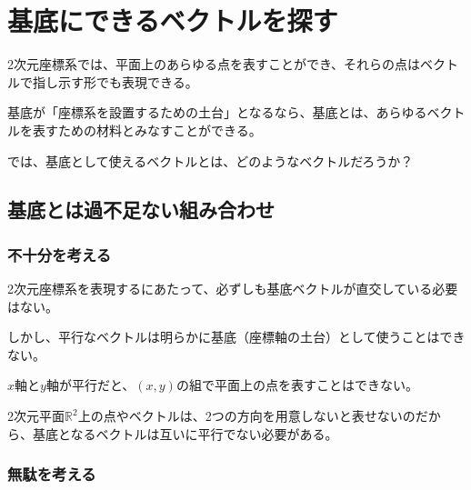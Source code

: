 \documentclass[../../imaging-math]{subfiles}
\begin{document}
\section{基底にできるベクトルを探す}

2次元座標系では、平面上のあらゆる点を表すことができ、それらの点はベクトルで指し示す形でも表現できる。

基底が「座標系を設置するための土台」となるなら、基底とは、あらゆるベクトルを表すための材料とみなすことができる。

\br

では、基底として使えるベクトルとは、どのようなベクトルだろうか？

\subsection{基底とは過不足ない組み合わせ}

\subsubsection{不十分を考える}

2次元座標系を表現するにあたって、必ずしも基底ベクトルが直交している必要はない。

しかし、平行なベクトルは明らかに基底（座標軸の土台）として使うことはできない。

\begin{center}
\end{center}

$x$軸と$y$軸が平行だと、$(x,y)$の組で平面上の点を表すことはできない。

2次元平面$\mathbb{R}^2$上の点やベクトルは、2つの方向を用意しないと表せないのだから、基底となるベクトルは互いに平行でない必要がある。

\subsubsection{無駄を考える}
\end{document}

